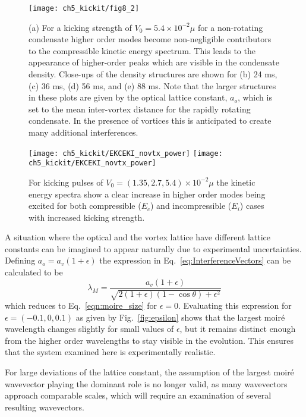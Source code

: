 \begin{figure}
    \centering
	\texttt{[image: ch5\_kickit/fig8\_2]}
	\caption[Higher order modes induced by stronger kicking.]{(a) For a kicking strength of $V_0 = 5.4\times10^{-2}\mu$ for a non-rotating condensate higher order modes become non-negligible contributors to the compressible kinetic energy spectrum. This leads to the appearance of higher-order peaks which are visible in the condensate density. Close-ups of the density structures are shown for (b) 24 ms, (c) 36 ms, (d) 56 ms, and (e) 88 ms. Note that the larger structures in these plots are given by the optical lattice constant, $a_o$, which is set to the mean inter-vortex distance for the rapidly rotating condensate. In the presence of vortices this is anticipated to create many additional interferences.}
	\label{fig:kickp20k}
\end{figure}
\begin{figure}
    \centering
    \texttt{[image: ch5\_kickit/EKCEKI\_novtx\_power]}
    \texttt{[image: ch5\_kickit/EKCEKI\_novtx\_power]}
	\caption[Comparison of kinetic energy spectra for increased kicking strengths.]{For kicking pulses of $V_0 = (1.35,2.7,5.4)\times 10^{-2} \mu$ the kinetic energy spectra show a clear increase in higher order modes being excited for both compressible ($E_c$) and incompressible ($E_i$) cases with increased kicking strength.}\label{fig:kick_compare_spec}
\end{figure}

    A situation where the optical and the vortex lattice have different lattice constants can be imagined to appear naturally due to experimental uncertainties. Defining $a_o = a_v(1+\epsilon)$ the expression in Eq.~\eqref{eq:InterferenceVectors} can be calculated to be
    \begin{equation}
    	\lambda_M = \frac{a_v(1+\epsilon)}{\sqrt{2(1+\epsilon)(1-\cos\theta) + \epsilon^2}}
    	\label{eqn:moire_size_eps}
    \end{equation}
    which reduces to Eq.~\eqref{eqn:moire_size} for $\epsilon=0$. Evaluating this expression for $\epsilon = (-0.1,0,0.1)$ as given by Fig.~\ref{fig:epsilon} shows that the largest moir\'e wavelength changes slightly for small values of $\epsilon$, but it remains distinct enough from the higher order wavelengths to stay visible in the evolution. This ensures that the system examined here is experimentally realistic.

    For large deviations of the lattice constant, the assumption of the largest moir\'e wavevector playing the dominant role is no longer valid, as many wavevectors approach comparable scales, which will require an examination of several resulting wavevectors.

